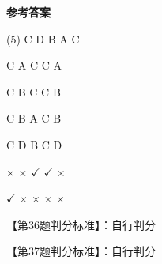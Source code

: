 \documentclass[11pt, a4paper]{article}
\begin{document}
\begin{center}
    \Huge \textbf{参考答案}
\end{center}

    \begin{tasks}[label=\arabic*. , label-width=14pt](5)
        \task C
        \task D
        \task B
        \task A
        \task C

        \task C
        \task A
        \task C
        \task C
        \task A

        \task C
        \task B
        \task C
        \task C
        \task B

        \task C
        \task B
        \task A
        \task C
        \task B

        \task C
        \task D
        \task B
        \task C
        \task D

        \task $\times$
        \task $\times$
        \task $\checkmark$
        \task $\checkmark$
        \task $\times$

        \task $\checkmark$
        \task $\times$
        \task $\times$
        \task $\times$
        \task $\times$
    \end{tasks}

    【第36题判分标准】：自行判分

    【第37题判分标准】：自行判分
\end{document}
